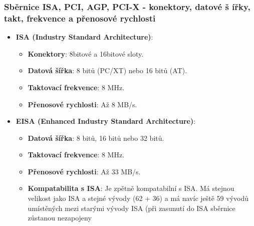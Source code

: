 \subsubsection{Sběrnice ISA, PCI, AGP, PCI-X - konektory, datové š  ířky, takt, frekvence a přenosové rychlosti}
\begin{itemize}
\item \textbf{ISA (Industry Standard Architecture)}:
\begin{itemize}
\item \textbf{Konektory}: 8bitové a 16bitové sloty.
\item \textbf{Datová šířka}: 8 bitů (PC/XT) nebo 16 bitů (AT).
\item \textbf{Taktovací frekvence}: 8 MHz.
\item \textbf{Přenosové rychlosti}: Až 8 MB/s.
\end{itemize}


\item \textbf{EISA (Enhanced Industry Standard Architecture)}:
\begin{itemize}
\item \textbf{Datová šířka}: 8 bitů, 16 bitů nebo 32 bitů.
\item \textbf{Taktovací frekvence}: 8 MHz.
\item \textbf{Přenosové rychlosti}: Až 33 MB/s.
\item \textbf{Kompatabilita s ISA}: Je zpětně kompatabilní s ISA. Má stejnou velikost jako ISA a stejné vývody (62 + 36) a má navíc ještě 59 vývodů umístěných mezi starými vývody ISA (při zasunutí do ISA sběrnice zůstanou nezapojeny
\end{itemize}



\end{itemize}
